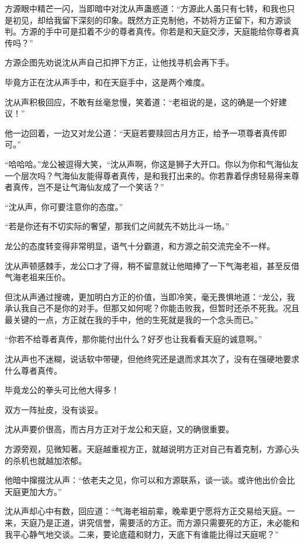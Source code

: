 \begin{this_body}
方源眼中精芒一闪，当即暗中对沈从声蛊惑道：“方源此人虽只有七转，和我也只是初见，却给我留下深刻的印象。既然方正克制他，不妨将方正留下，和方源谈判。方源的手中可是扣着不少的尊者真传。你若是和天庭交涉，天庭能给你尊者真传吗？”

方源企图先劝说沈从声自己扣押下方正，让他找寻机会再下手。

毕竟方正在沈从声手中，和在天庭手中，这是两个难度。

沈从声积极回应，不敢有丝毫怠慢，笑着道：“老祖说的是，这的确是一个好建议！”

他一边回着，一边又对龙公道：“天庭若要赎回古月方正，给予一项尊者真传即可。”

“哈哈哈。”龙公被逗得大笑，“沈从声啊，你这是狮子大开口。你以为你和气海仙友一个层次吗？气海仙友能得尊者真传，是和我打出来的。你若靠着俘虏轻易得来尊者真传，岂不是让气海仙友成了一个笑话？”

“沈从声，你可要注意你的态度。”

“若是你还有不切实际的奢望，那我们之间就先不妨比斗一场。”

龙公的态度转变得非常明显，语气十分霸道，和方源之前交流完全不一样。

沈从声顿感棘手，龙公口才了得，稍不留意就让他暗捧了一下气海老祖，甚至反借气海老祖来压价。

但沈从声通过搜魂，更加明白方正的价值，当即冷笑，毫无畏惧地道：“龙公，我承认我自己不是你的对手。但那又如何呢？你能击败我，但暂时还杀不死我。况且最关键的一点，方正就在我的手中，他的生死就是我的一个念头而已。”

“你若不给尊者真传，那你能付出什么？好歹也让我看看天庭的诚意啊。”

沈从声也不迷糊，说话软中带硬，但他终究还是退而求其次了，没有在强硬地要求什么尊者真传。

毕竟龙公的拳头可比他大得多！

双方一阵扯皮，没有谈妥。

沈从声要价很高，而古月方正对于龙公和天庭，又的确很重要。

方源旁观，见微知著。天庭越重视方正，就越说明方正对自己有着克制，方源心头的杀机也就越加浓郁。

他暗中撺掇沈从声：“依老夫之见，你可以和方源联系，谈一谈。或许他出价会比天庭更加大方。”

沈从声却心中有数，回应道：“气海老祖前辈，晚辈更宁愿将方正交易给天庭。一来，天庭乃是正道，讲究信誉，需要活的方正。而方源只需要死的方正，未必能和我平心静气地交谈。二来，要论底蕴和财力，天底下有谁能比得过天庭呢？”


\end{this_body}
